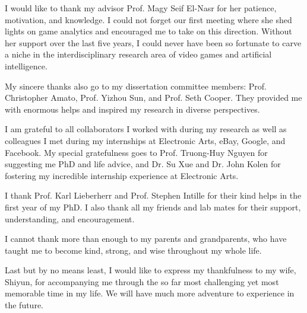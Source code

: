 \documentclass[
11pt, %
english, %
doublespacing, %
headsepline, %
]{MastersDoctoralThesis} %
\begin{document}
\begin{acknowledgements}
\addchaptertocentry{\acknowledgementname} %
I would like to thank my advisor Prof. Magy Seif El-Nasr for her patience, motivation, and knowledge. I could not forget our first meeting where she shed lights on game analytics and encouraged me to take on this direction. Without her support over the last five years, I could never have been so fortunate to carve a niche in the interdisciplinary research area of video games and artificial intelligence.

My sincere thanks also go to my dissertation committee members: Prof. Christopher Amato, Prof. Yizhou Sun, and Prof. Seth Cooper. They provided me with enormous helps and inspired my research in diverse perspectives. 

I am grateful to all collaborators I worked with during my research as well as colleagues I met during my internships at Electronic Arts, eBay, Google, and Facebook. My special gratefulness goes to Prof. Truong-Huy Nguyen for suggesting me PhD and life advice, and Dr. Su Xue and Dr. John Kolen for fostering my incredible internship experience at Electronic Arts.

I thank Prof. Karl Lieberherr and Prof. Stephen Intille for their kind helps in the first year of my PhD. I also thank all my friends and lab mates for their support, understanding, and encouragement.

I cannot thank more than enough to my parents and grandparents, who have taught me to become kind, strong, and wise throughout my whole life.

Last but by no means least, I would like to express my thankfulness to my wife, Shiyun, for accompanying me through the so far most challenging yet most memorable time in my life. We will have much more adventure to experience in the future.
\end{acknowledgements}


\tableofcontents %

\listoffigures %

\listoftables %

\end{document}
